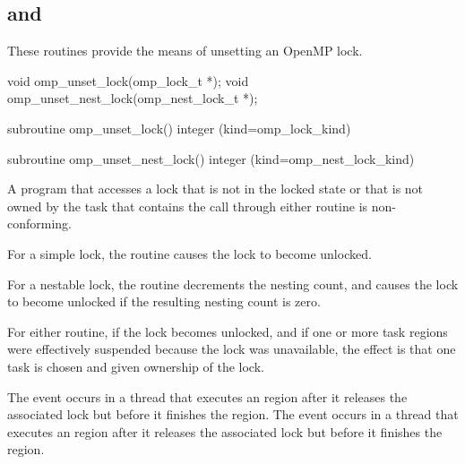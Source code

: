 \subsection{ and }
\label{subsec:omp_unset_lock and omp_unset_nest_lock}
\summary
These routines provide the means of unsetting an OpenMP lock.

\format
\begin{ccppspecific}
\begin{ompcFunction}
void omp_unset_lock(omp_lock_t *);
void omp_unset_nest_lock(omp_nest_lock_t *);
\end{ompcFunction}
\end{ccppspecific}


\begin{fortranspecific}
\begin{ompfSubroutine}
subroutine omp_unset_lock()
integer (kind=omp_lock_kind) 

subroutine omp_unset_nest_lock()
integer (kind=omp_nest_lock_kind) 
\end{ompfSubroutine}
\end{fortranspecific}

\constraints
A program that accesses a lock that is not in the locked state or that is
not owned by the task that contains the call through either routine is
non-conforming.

\effect
For a simple lock, the  routine causes the lock to 
become unlocked.

For a nestable lock, the  routine decrements 
the nesting count, and causes the lock to become unlocked if the resulting 
nesting count is zero.

For either routine, if the lock becomes unlocked, and if one or more task
regions were effectively suspended because the lock was unavailable, the
effect is that one task is chosen and given ownership of the lock.

\events
The  event occurs in a thread that executes an 
 region after it releases the associated lock but 
before it finishes the region. The  event occurs 
in a thread that executes an  region after it 
releases the associated lock but before it finishes the region.

